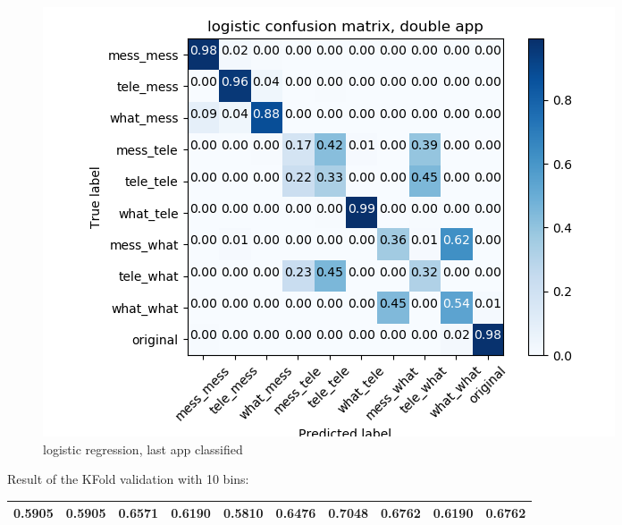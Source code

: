  \begin{figure}[H] 
\centering 
\includegraphics[scale=.6]{images/lr_initial_double_complete.png} 
\caption{logistic regression, last app classified} 
\end{figure} 


Result of the KFold validation with 10 bins:
 {\def\arraystretch{1.3} 
 \begin{table}[H] 
\centering 
\begin{tabular}{|l |l |l |l |l |l |l |l |l |l |}  
\hline 
0.5905&
0.5905&
0.6571&
0.6190&
0.5810&
0.6476&
0.7048&
0.6762&
0.6190&
0.6762\\ \hline  

\end{tabular} 
\end{table} }

